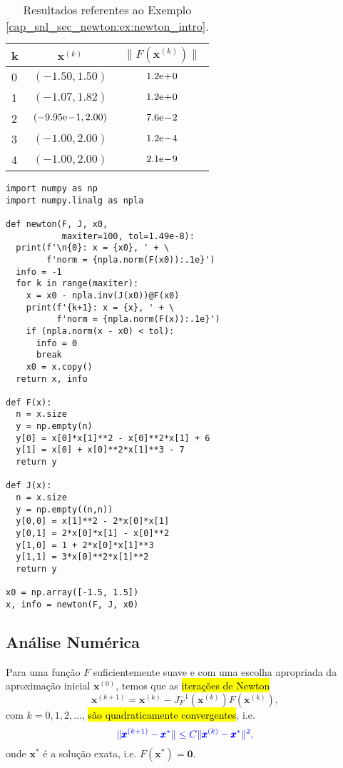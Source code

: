 \begin{ex}
  \begin{table}[H]
    \centering
    \caption{Resultados referentes ao Exemplo \ref{cap_snl_sec_newton:ex:newton_intro}.}
    \begin{tabular}{lcc}\toprule
      k & $\pmb{x}^{(k)}$ & $\|F(\pmb{x}^{(k)})\|$\\\midrule
      0 & $(-1.50, 1.50)$ & $1.2\mathrm{e}\!+\!0$\\
      1 & $(-1.07, 1.82)$ & $1.2\mathrm{e}\!+\!0$\\
      2 & $(-9.95\mathrm{e}\!-\!1, 2.00)$ & $7.6\mathrm{e}\!-\!2$\\
      3 & $(-1.00, 2.00)$ & $1.2\mathrm{e}\!-\!4$ \\
      4 & $(-1.00, 2.00)$ & $2.1\mathrm{e}\!-\!9$ \\\bottomrule
    \end{tabular}
    \label{cap_snl_sec_newton:tab:newton_intro}
  \end{table}

\begin{lstlisting}
import numpy as np
import numpy.linalg as npla

def newton(F, J, x0, 
           maxiter=100, tol=1.49e-8):
  print(f'\n{0}: x = {x0}, ' + \
        f'norm = {npla.norm(F(x0)):.1e}')
  info = -1
  for k in range(maxiter):
    x = x0 - npla.inv(J(x0))@F(x0)
    print(f'{k+1}: x = {x}, ' + \
          f'norm = {npla.norm(F(x)):.1e}')
    if (npla.norm(x - x0) < tol):
      info = 0
      break
    x0 = x.copy()
  return x, info

def F(x):
  n = x.size
  y = np.empty(n)
  y[0] = x[0]*x[1]**2 - x[0]**2*x[1] + 6
  y[1] = x[0] + x[0]**2*x[1]**3 - 7
  return y

def J(x):
  n = x.size
  y = np.empty((n,n))
  y[0,0] = x[1]**2 - 2*x[0]*x[1]
  y[0,1] = 2*x[0]*x[1] - x[0]**2
  y[1,0] = 1 + 2*x[0]*x[1]**3
  y[1,1] = 3*x[0]**2*x[1]**2
  return y

x0 = np.array([-1.5, 1.5])
x, info = newton(F, J, x0)
\end{lstlisting}

\end{ex}

\subsection{Análise Numérica}

Para uma função $F$ suficientemente suave e com uma escolha apropriada da aproximação inicial $\pmb{x}^{(0)}$, temos que as \hl{iterações de Newton}
\begin{equation}
  \pmb{x}^{(k+1)} = \pmb{x}^{(k)} - J_F^{-1}(\pmb{x}^{(k)})F(\pmb{x}^{(k)}),
\end{equation}
com $k=0, 1, 2, \ldots$, \hl{são quadraticamente convergentes}, i.e.
\begin{equation}\color{blue}\|\pmb{x}^{(k+1)} - \pmb{x}^*\| \leq C\|\pmb{x}^{(k)}-\pmb{x}^*\|^2,
\end{equation}
onde $\pmb{x}^*$ é a solução exata, i.e. $F(\pmb{x}^*) = \pmb{0}$.

